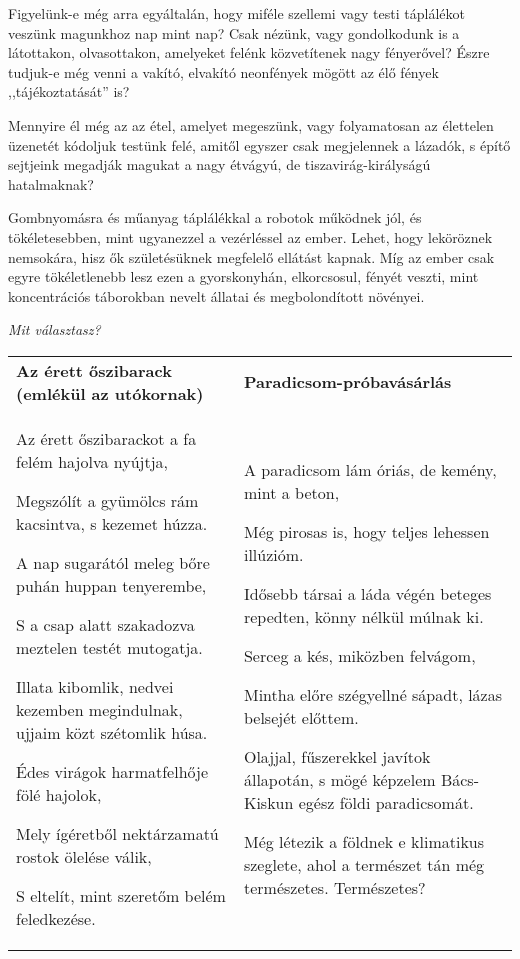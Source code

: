 \bigskip
\begin{itshape}
Figyelünk-e még arra egyáltalán, hogy miféle szellemi vagy testi táplálékot
veszünk magunkhoz nap mint nap? Csak nézünk, vagy gondolkodunk
is a látottakon, olvasottakon, amelyeket felénk közvetítenek nagy fényerővel?
Észre tudjuk-e még venni a vakító, elvakító neonfények mögött az élő
fények ,,tájékoztatását'' is?

Mennyire él még az az étel, amelyet megeszünk, vagy folyamatosan az
élettelen üzenetét kódoljuk testünk felé, amitől egyszer csak megjelennek a
lázadók, s építő sejtjeink megadják magukat a nagy étvágyú, de
tiszavirág-királyságú hatalmaknak?

Gombnyomásra és műanyag táplálékkal a robotok működnek jól, és tökéletesebben,
mint ugyanezzel a vezérléssel az ember. Lehet, hogy leköröznek
nemsokára, hisz ők születésüknek megfelelő ellátást kapnak. Míg az ember
csak egyre tökéletlenebb lesz ezen a gyorskonyhán, elkorcsosul, fényét veszti,
mint koncentrációs táborokban nevelt állatai és megbolondított növényei.
\end{itshape}

\textit{Mit választasz?}
\bigskip

\noindent
\begin{tabularx}{\textwidth}{@{}LL@{}}
\textbf{Az érett őszibarack (emlékül az utókornak)} &
\textbf{Paradicsom-pró\-ba\-vá\-sár\-lás} \\
\addlinespace

Az érett őszibarackot a fa felém
hajolva nyújtja,

Megszólít a gyümölcs rám kacsintva,
s kezemet húzza.

A nap sugarától meleg bőre puhán
huppan tenyerembe,

S a csap alatt szakadozva meztelen
testét mutogatja.

Illata kibomlik, nedvei kezemben
megindulnak, ujjaim közt szétomlik
húsa.

Édes virágok harmatfelhője fölé
hajolok,

Mely ígéretből nektárzamatú
rostok ölelése válik,

S eltelít, mint szeretőm belém
feledkezése.
&

A paradicsom lám óriás, de kemény,
mint a beton,

Még pirosas is, hogy teljes lehessen
illúzióm.

Idősebb társai a láda végén
beteges repedten, könny nélkül
múlnak ki.

Serceg a kés, miközben felvágom,

Mintha előre szégyellné sápadt,
lázas belsejét előttem.

Olajjal, fűszerekkel javítok
állapotán, s mögé képzelem Bács-Kiskun
egész földi paradicsomát.

Még létezik a földnek e klimatikus
szeglete, ahol a természet tán
még természetes. Természetes?
\end{tabularx}

